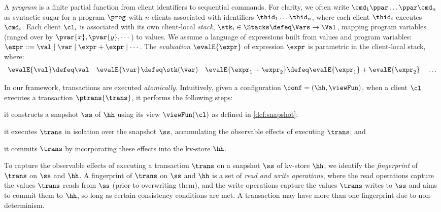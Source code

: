 A {\em program} is a finite partial function from client identifiers to sequential
commands.
For clarity, we often write \( \cmd_{1}\ppar \dots \ppar \cmd_{n}\) as syntactic sugar 
for a program \( \prog \) with $n$ clients associated with identifiers
$\thid_1 \dots \thid_n$, where each client $\thid_i$ executes
$\cmd_i$. 
Each client $\cl_i$ is associated with its own client-local  \emph{stack}, 
$\stk_i \in \Stacks \defeq \Vars \to \Val$,  mapping program variables
(ranged over by $\pvar{x}, \pvar{y}, \cdots$)
to values. 
We assume a language of expressions built from values
and program variables:
$\expr ::= \val \mid \var \mid \expr + \expr \mid \cdots$.
The \emph{evaluation} $\evalE{\expr}$ of  expression $\expr$ is parametric in
the client-local stack, where:
\begin{gather*}
\evalE{\val} \defeq
\val
\quad
\evalE{\var} \defeq
\stk(\var)
\quad
\evalE{\expr_{1} + \expr_{2}} \defeq
\evalE{\expr_{1}} + \evalE{\expr_{2}}
\quad
\dots
\end{gather*}

In our framework, transactions are executed \emph{atomically}. 
Intuitively, given a configuration $\conf = (\hh, \viewFun)$, 
when a client $\cl$ executes a transaction $\ptrans{\trans}$, 
it performs the following steps: 
\begin{enumerate*}
	\item it constructs a snapshot $\ss$ of $\hh$ using its view $\viewFun(\cl)$ as defined in \cref{def:snapshot};  
	\item it executes $\trans$ in isolation over the snapshot $\ss$, accumulating the observable 
effects of executing $\trans$; and
	\item it commits $\trans$ by incorporating these effects into 
the kv-store $\hh$.
\end{enumerate*}


To capture the observable effects of executing a transaction $\trans$ on a snapshot $\ss$ of kv-store $\hh$, 
we identify the \emph{fingerprint} of $\trans$ on $\ss$ and $\hh$.
A fingerprint of $\trans$ on $\ss$ and $\hh$
is a set of \emph{read and write operations}, where
the read operations capture the values $\trans$ reads from $\ss$ (prior to overwriting them), and
the write operations capture the values $\trans$ writes to $\ss$ and aims to commit them to $\hh$, so long as certain consistency conditions are met.  
A transaction may have more than one fingerprint due to non-determinism. 




